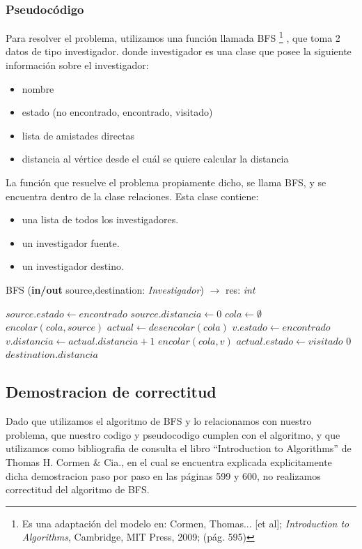 \subsubsection{Pseudocódigo}

\indent Para resolver el problema, utilizamos una función  llamada BFS
\footnote{Es una adaptación del modelo en: Cormen, Thomas... [et al];
\textit{Introduction to Algorithms}, Cambridge, MIT Press, 2009; (p\'ag. 595)}
, que toma
2 datos de tipo investigador. donde investigador es una clase que posee la
siguiente información sobre el investigador:
\begin{itemize}
	\item nombre
	\item estado (no encontrado, encontrado, visitado)
	\item lista de amistades directas
	\item distancia al vértice desde el cuál se quiere calcular la distancia
\end{itemize}
\indent La función que resuelve el problema propiamente dicho, se llama BFS, y
se encuentra dentro de la clase relaciones. Esta clase contiene:
\begin{itemize}
\item una lista de todos los investigadores.
\item un investigador fuente.
\item un investigador destino.
\end{itemize}

\begin{algorithm}
\caption{BFS (\textbf{in/out} source,destination: \textsl{Investigador})
$\rightarrow$ res: \textsl{int}}
\begin{algorithmic}[1]

\STATE $source.estado \leftarrow encontrado$
\STATE $source.distancia \leftarrow 0$
\STATE $cola \leftarrow \emptyset$
\STATE $encolar(cola,source)$
	\STATE $actual \leftarrow desencolar(cola)$
			\STATE $v.estado \leftarrow encontrado$
			\STATE $v.distancia \leftarrow actual.distancia + 1$
			\STATE $encolar(cola,v)$
		\ENDIF
	\ENDFOR
	\STATE $actual.estado \leftarrow visitado$
\ENDWHILE
{}
	\RETURN $0$
\ELSE
	\RETURN $destination.distancia$
\ENDIF
\end{algorithmic}
\end{algorithm}

\subsection{Demostracion de correctitud}
\indent Dado que utilizamos el algoritmo de BFS y lo relacionamos con nuestro
problema, que nuestro codigo y pseudocodigo cumplen con el algoritmo, y que
utilizamos como bibliografia de consulta el libro ``Introduction to Algorithms''
de Thomas H. Cormen \& Cia., en el cual se encuentra explicada  explicitamente
dicha demostracion paso por paso en las páginas 599 y 600, no realizamos
correctitud del algoritmo de BFS.

